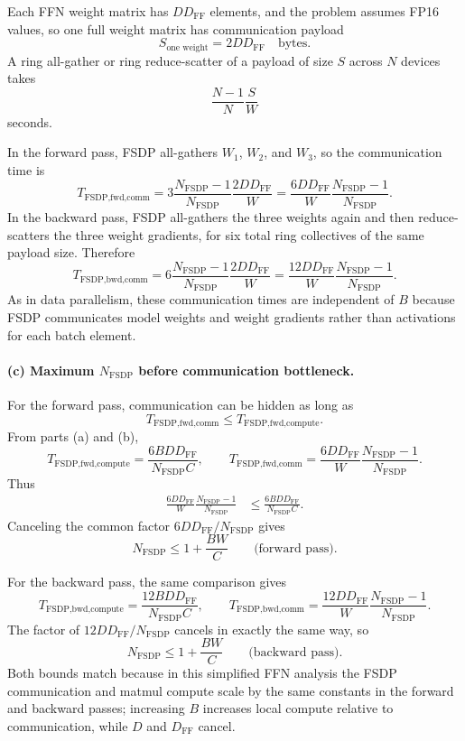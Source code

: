 \documentclass[11pt]{article}
\begin{document}
Each FFN weight matrix has $D D_{\text{FF}}$ elements, and the problem assumes
FP16 values, so one full weight matrix has communication payload
\[
  S_{\text{one weight}}
  =
  2D D_{\text{FF}}
  \quad\text{bytes}.
\]
A ring all-gather or ring reduce-scatter of a payload of size $S$ across $N$
devices takes
\[
  \frac{N-1}{N}\frac{S}{W}
\]
seconds.

In the forward pass, FSDP all-gathers $W_1$, $W_2$, and $W_3$, so the
communication time is
\[
  \boxed{
    T_{\text{FSDP,fwd,comm}}
    =
    3
    \frac{N_{\text{FSDP}}-1}{N_{\text{FSDP}}}
    \frac{2D D_{\text{FF}}}{W}
    =
    \frac{6D D_{\text{FF}}}{W}
    \frac{N_{\text{FSDP}}-1}{N_{\text{FSDP}}}
  }.
\]
In the backward pass, FSDP all-gathers the three weights again and then
reduce-scatters the three weight gradients, for six total ring collectives of
the same payload size. Therefore
\[
  \boxed{
    T_{\text{FSDP,bwd,comm}}
    =
    6
    \frac{N_{\text{FSDP}}-1}{N_{\text{FSDP}}}
    \frac{2D D_{\text{FF}}}{W}
    =
    \frac{12D D_{\text{FF}}}{W}
    \frac{N_{\text{FSDP}}-1}{N_{\text{FSDP}}}
  }.
\]
As in data parallelism, these communication times are independent of $B$
because FSDP communicates model weights and weight gradients rather than
activations for each batch element.


\paragraph{(c) Maximum $N_{\text{FSDP}}$ before communication bottleneck.}

For the forward pass, communication can be hidden as long as
\[
  T_{\text{FSDP,fwd,comm}}
  \le
  T_{\text{FSDP,fwd,compute}}.
\]
From parts (a) and (b),
\[
  T_{\text{FSDP,fwd,compute}}
  =
  \frac{6 B D D_{\text{FF}}}{N_{\text{FSDP}} C},
  \qquad
  T_{\text{FSDP,fwd,comm}}
  =
  \frac{6D D_{\text{FF}}}{W}
  \frac{N_{\text{FSDP}}-1}{N_{\text{FSDP}}}.
\]
Thus
\begin{align*}
  \frac{6D D_{\text{FF}}}{W}
  \frac{N_{\text{FSDP}}-1}{N_{\text{FSDP}}}
  &\le
  \frac{6 B D D_{\text{FF}}}{N_{\text{FSDP}} C}.
\end{align*}
Canceling the common factor $6D D_{\text{FF}}/N_{\text{FSDP}}$ gives
\[
  \boxed{
    N_{\text{FSDP}}
    \le
    1 + \frac{BW}{C}
  }
  \qquad\text{(forward pass)}.
\]

For the backward pass, the same comparison gives
\[
  T_{\text{FSDP,bwd,compute}}
  =
  \frac{12 B D D_{\text{FF}}}{N_{\text{FSDP}} C},
  \qquad
  T_{\text{FSDP,bwd,comm}}
  =
  \frac{12D D_{\text{FF}}}{W}
  \frac{N_{\text{FSDP}}-1}{N_{\text{FSDP}}}.
\]
The factor of $12D D_{\text{FF}}/N_{\text{FSDP}}$ cancels in exactly the same
way, so
\[
  \boxed{
    N_{\text{FSDP}}
    \le
    1 + \frac{BW}{C}
  }
  \qquad\text{(backward pass)}.
\]
Both bounds match because in this simplified FFN analysis the FSDP
communication and matmul compute scale by the same constants in the forward
and backward passes; increasing $B$ increases local compute relative to
communication, while $D$ and $D_{\text{FF}}$ cancel.
\end{document}
